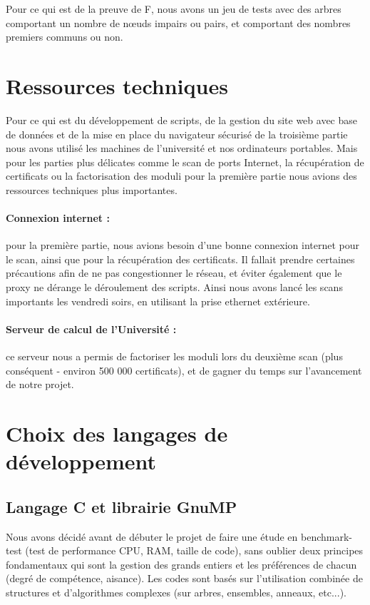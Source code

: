 Pour ce qui est de la preuve de F, nous avons un jeu de tests avec des arbres comportant un nombre de nœuds impairs ou pairs, et comportant des nombres premiers communs ou non.

\section{Ressources techniques}

Pour ce qui est du développement de scripts, de la gestion du site web avec base de données et de la mise en place du navigateur sécurisé de la troisième partie nous avons utilisé les machines de l'université et nos ordinateurs portables. Mais pour les parties plus délicates comme le scan de ports Internet, la récupération de certificats ou la factorisation des moduli pour la première partie nous avions des ressources techniques plus importantes.

\paragraph{Connexion internet : } pour la première partie, nous avions besoin d'une bonne connexion internet pour le scan, ainsi que pour la récupération des certificats. Il fallait prendre certaines précautions afin de ne pas congestionner le réseau, et éviter également que le proxy ne dérange le déroulement des scripts. Ainsi nous avons lancé les scans importants les vendredi soirs, en utilisant la prise ethernet extérieure.

\paragraph{Serveur de calcul de l'Université :} ce serveur nous a permis de factoriser les moduli lors du deuxième scan (plus conséquent - environ 500 000 certificats), et de gagner du temps sur l'avancement de notre projet.

\section{Choix des langages de développement}

\subsection{Langage C et librairie GnuMP}

Nous avons décidé avant de débuter le projet de faire une étude en benchmark-test \cite{chooseprogram2013} \cite{marceau2009program} \cite{udemypng} (test de performance CPU, RAM, taille de code), sans oublier deux principes fondamentaux qui sont la gestion des grands entiers et les préférences de chacun (degré de compétence, aisance). Les codes sont basés sur l'utilisation combinée de structures et d'algorithmes complexes (sur arbres, ensembles, anneaux, etc...).\\

